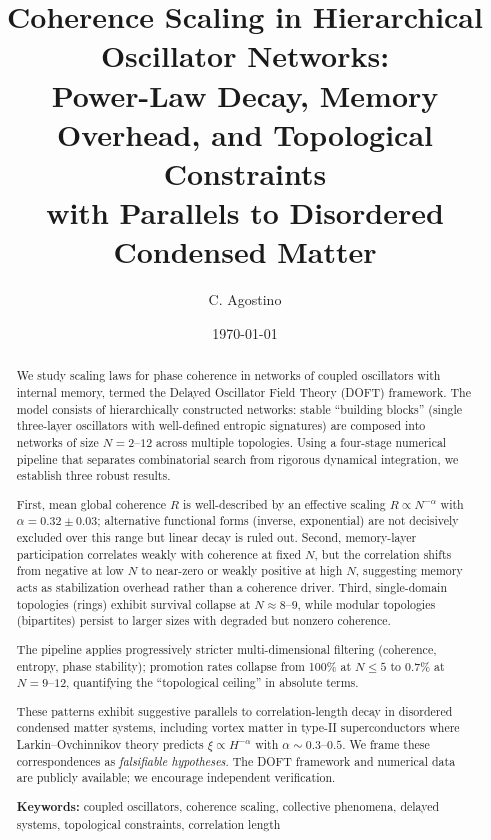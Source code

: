 \documentclass[reprint,aps,prb,superscriptaddress,floatfix]{revtex4-2}
\begin{document}
\title{Coherence Scaling in Hierarchical Oscillator Networks:\\Power-Law Decay, Memory Overhead, and Topological Constraints\\with Parallels to Disordered Condensed Matter}

\author{C. Agostino}
\date{\today}

\begin{abstract}
We study scaling laws for phase coherence in networks of coupled oscillators with internal memory, termed the Delayed Oscillator Field Theory (DOFT) framework. The model consists of hierarchically constructed networks: stable ``building blocks'' (single three-layer oscillators with well-defined entropic signatures) are composed into networks of size $N = 2$--$12$ across multiple topologies. Using a four-stage numerical pipeline that separates combinatorial search from rigorous dynamical integration, we establish three robust results.

First, mean global coherence $R$ is well-described by an effective scaling $R \propto N^{-\alpha}$ with $\alpha = 0.32 \pm 0.03$; alternative functional forms (inverse, exponential) are not decisively excluded over this range but linear decay is ruled out. Second, memory-layer participation correlates weakly with coherence at fixed $N$, but the correlation shifts from negative at low $N$ to near-zero or weakly positive at high $N$, suggesting memory acts as stabilization overhead rather than a coherence driver. Third, single-domain topologies (rings) exhibit survival collapse at $N \approx 8$--$9$, while modular topologies (bipartites) persist to larger sizes with degraded but nonzero coherence.

The pipeline applies progressively stricter multi-dimensional filtering (coherence, entropy, phase stability); promotion rates collapse from 100\% at $N \leq 5$ to 0.7\% at $N = 9$--$12$, quantifying the ``topological ceiling'' in absolute terms.

These patterns exhibit suggestive parallels to correlation-length decay in disordered condensed matter systems, including vortex matter in type-II superconductors where Larkin--Ovchinnikov theory predicts $\xi \propto H^{-\alpha}$ with $\alpha \sim 0.3$--$0.5$. We frame these correspondences as \emph{falsifiable hypotheses}. The DOFT framework and numerical data are publicly available; we encourage independent verification.

\textbf{Keywords:} coupled oscillators, coherence scaling, collective phenomena, delayed systems, topological constraints, correlation length
\end{abstract}
\end{document}
